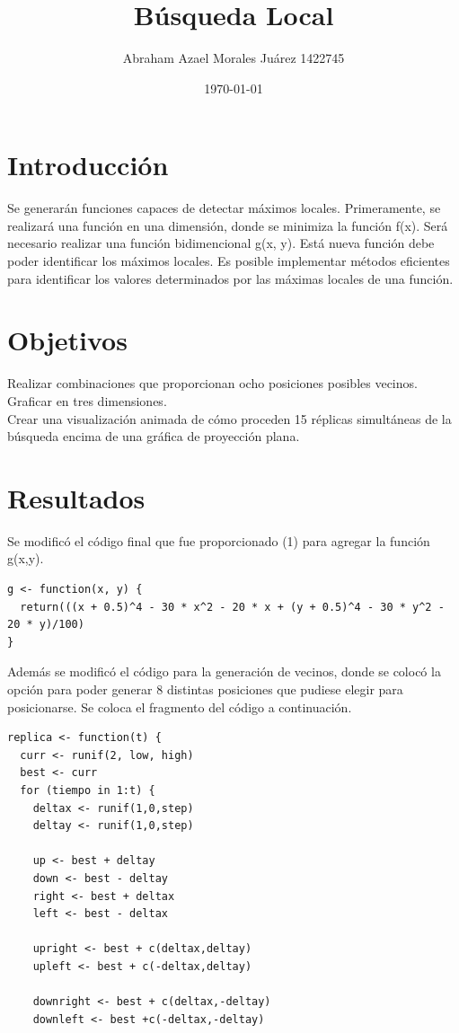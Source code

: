 \documentclass{article}
\author{Abraham Azael Morales Juárez  1422745}
\title{Búsqueda Local}
\date{\today}
\begin{document}
\maketitle

\section{Introducción}
Se generarán funciones capaces de detectar máximos locales. Primeramente, se realizará una función en una dimensión, donde se minimiza la función f(x). Será necesario realizar una función bidimencional g(x, y). Está nueva función debe poder identificar los máximos locales. Es posible implementar métodos eficientes \cite{REF1} para identificar los valores determinados por las máximas locales de una función\cite{REF2}. 

\section{Objetivos}
Realizar combinaciones que proporcionan ocho posiciones posibles vecinos.\\
Graficar en tres dimensiones.\\
Crear una visualización animada de cómo proceden 15 réplicas simultáneas de la búsqueda encima de una gráfica de proyección plana.

\section{Resultados}
Se modificó el código final que fue proporcionado (1) para agregar la función g(x,y).
\begin{lstlisting}[frame=single]
g <- function(x, y) {
  return(((x + 0.5)^4 - 30 * x^2 - 20 * x + (y + 0.5)^4 - 30 * y^2 - 20 * y)/100)
}
  \end{lstlisting}
  
Además se modificó el código para la generación de vecinos, donde se colocó la opción para poder generar 8 distintas posiciones que pudiese elegir para posicionarse. Se coloca el fragmento del código a continuación.

\begin{lstlisting}[frame=single]
replica <- function(t) {
  curr <- runif(2, low, high)
  best <- curr
  for (tiempo in 1:t) {
    deltax <- runif(1,0,step)
    deltay <- runif(1,0,step)
    
    up <- best + deltay
    down <- best - deltay
    right <- best + deltax
    left <- best - deltax
    
    upright <- best + c(deltax,deltay)
    upleft <- best + c(-deltax,deltay)
    
    downright <- best + c(deltax,-deltay)
    downleft <- best +c(-deltax,-deltay)
   
    \end{lstlisting}
\end{document}
